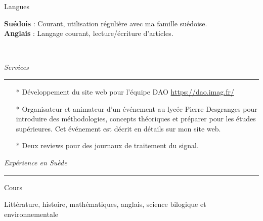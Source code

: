 {	\noindent
	\begin{minipage}{0.20\textwidth}
		\color{MyGray} Langues
	\end{minipage}
	\hfill
	\begin{minipage}{0.70\textwidth}
		\textbf{Suédois} : Courant, utilisation régulière avec ma famille suédoise.\\
		\textbf{Anglais} : Langage courant, lecture/écriture d'articles.\\
	\end{minipage}\\
	\vspace{2mm}
	
	\noindent
	\textit{\Large \color{MyGray} \hspace{5mm} Services}
	\vspace{2mm}
	{\color{DefaultGray}\hrule height .1pt}
	\vspace{5mm}
	
	\begin{itemize}
		\setlength\itemsep{3mm}
		\item[*] Développement du site web pour l'équipe DAO \url{https://dao.imag.fr/}
		\item[*] Organisateur et animateur d'un événement au lycée Pierre Desgranges pour introduire des méthodologies, concepts théoriques et préparer pour les études supérieures. Cet événement est décrit en détails sur mon site web.
		\item[*] Deux reviews pour des journaux de traitement du signal.
	\end{itemize}
	\vspace{5mm}
	
	\noindent
	\textit{\Large \color{MyGray} \hspace{5mm} Expérience en Suède}
	\vspace{2mm}
	{\color{DefaultGray}\hrule height .1pt}
	\vspace{5mm}
	
	\noindent
	\begin{minipage}{0.20\textwidth}
		\color{MyGray} Cours
	\end{minipage}
	\hfill
	\begin{minipage}{0.70\textwidth}
		Littérature, histoire, mathématiques, anglais, science bilogique et environnementale
	\end{minipage}\\
	\vspace{2mm}
	
}
